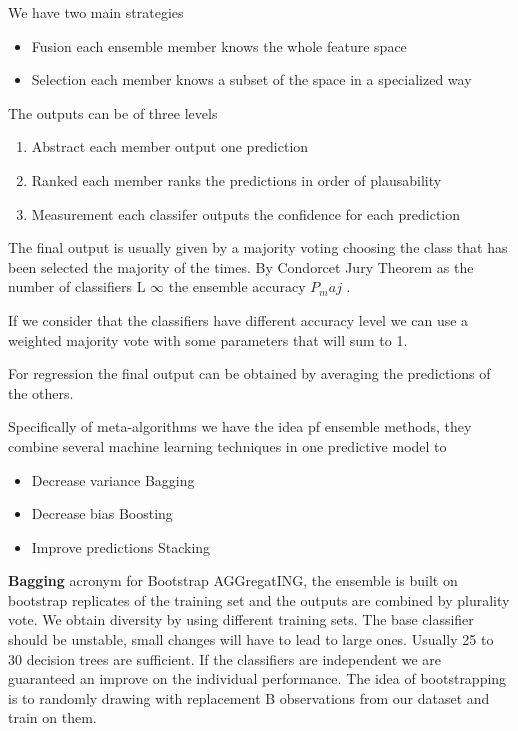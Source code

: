 We have two main strategies
\begin{itemize}
    \item Fusion \ra each ensemble member knows the whole feature space
    \item Selection \ra each member knows a subset of the space in a specialized way
\end{itemize}


The outputs can be of three levels

\begin{enumerate}
    \item Abstract \ra each member output one prediction
    \item Ranked \ra each member ranks the predictions in order of plausability
    \item Measurement \ra each classifer outputs the confidence for each prediction
\end{enumerate}

The final output is usually given by a majority voting choosing the class that has been selected the majority of the times. By Condorcet Jury Theorem as the number of classifiers L \ra $\infty$ the ensemble accuracy $P_maj$ .

\vspace{10pt}

If we consider that the classifiers have different accuracy level we can use a weighted majority vote with some parameters that will sum to 1. 

\vspace{10pt}

For regression the final output can be obtained by averaging the predictions of the others. 

\vspace{10pt}

Specifically of meta-algorithms we have the idea pf ensemble methods, they combine several machine learning techniques in one predictive model to

\begin{itemize}
    \item Decrease variance \ra Bagging
    \item Decrease bias \ra Boosting
    \item Improve predictions \ra Stacking
\end{itemize}

\vspace{10pt}

\textbf{Bagging} \ra acronym for Bootstrap AGGregatING, the ensemble is built on bootstrap replicates of the training set and the outputs are combined by plurality vote. We obtain diversity by using different training sets. The base classifier should be unstable, small changes will have to lead to large ones. Usually 25 to 30 decision trees are sufficient. If the classifiers are independent we are guaranteed an improve on the individual performance. The idea of bootstrapping is to randomly drawing with replacement B observations from our dataset and train on them.

